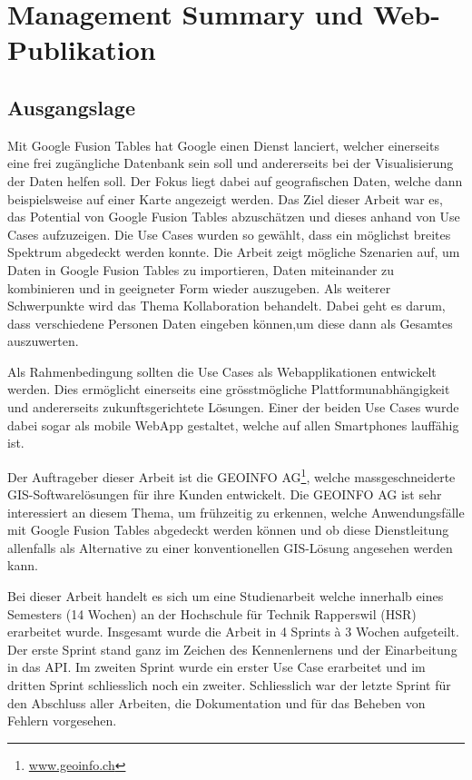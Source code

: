 \chapter*{Management Summary und Web-Publikation}
\thispagestyle{scrheadings}

\section*{Ausgangslage}
Mit Google Fusion Tables hat Google einen Dienst lanciert, welcher einerseits eine frei zugängliche Datenbank sein soll und andererseits bei der Visualisierung der Daten helfen soll. Der Fokus liegt dabei auf geografischen Daten, welche dann beispielsweise auf einer Karte angezeigt werden.
Das Ziel dieser Arbeit war es, das Potential von Google Fusion Tables abzuschätzen und dieses anhand von Use Cases aufzuzeigen. Die Use Cases wurden so gewählt, dass ein möglichst breites Spektrum abgedeckt werden konnte. Die Arbeit zeigt mögliche Szenarien auf, um Daten in Google Fusion Tables zu importieren, Daten miteinander zu kombinieren und in geeigneter Form wieder auszugeben. Als weiterer Schwerpunkte wird das Thema Kollaboration behandelt. Dabei geht es darum, dass verschiedene Personen Daten eingeben können,um diese dann als Gesamtes auszuwerten.

Als Rahmenbedingung sollten die Use Cases als Webapplikationen entwickelt werden. Dies ermöglicht einerseits eine grösstmögliche Plattformunabhängigkeit und andererseits zukunftsgerichtete Lösungen. Einer der beiden Use Cases wurde dabei sogar als mobile \gls{WebApp} gestaltet, welche auf allen Smartphones lauffähig ist.

Der Auftrageber dieser Arbeit ist die GEOINFO AG\footnote{\url{www.geoinfo.ch}}, welche massgeschneiderte \gls{GIS}-Softwarelösungen für ihre Kunden entwickelt. Die GEOINFO AG ist sehr interessiert an diesem Thema, um frühzeitig zu erkennen, welche Anwendungsfälle mit Google Fusion Tables abgedeckt werden können und ob diese Dienstleitung allenfalls als Alternative zu einer konventionellen \gls{GIS}-Lösung angesehen werden kann.

Bei dieser Arbeit handelt es sich um eine Studienarbeit welche innerhalb eines Semesters (14 Wochen) an der Hochschule für Technik Rapperswil (HSR) erarbeitet wurde. Insgesamt wurde die Arbeit in 4 Sprints à 3 Wochen aufgeteilt. Der erste Sprint stand ganz im Zeichen des Kennenlernens und der Einarbeitung in das \gls{API}. Im zweiten Sprint wurde ein erster Use Case erarbeitet und im dritten Sprint schliesslich noch ein zweiter. Schliesslich war der letzte Sprint für den Abschluss aller Arbeiten, die Dokumentation und für das Beheben von Fehlern vorgesehen.

